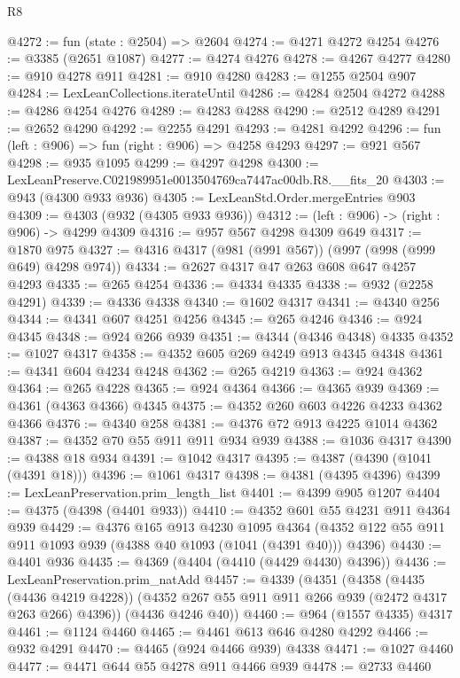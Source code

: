 \begin{lexlean}{R8}
\begin{coremodule}
@4272 := fun (state : @2504) => @2604
@4274 := @4271 @4272 @4254
@4276 := @3385 (@2651 @1087)
@4277 := @4274 @4276
@4278 := @4267 @4277
@4280 := @910 @4278 @911
@4281 := @910 @4280
@4283 := @1255 @2504 @907
@4284 := LexLeanCollections.iterateUntil
@4286 := @4284 @2504 @4272
@4288 := @4286 @4254 @4276
@4289 := @4283 @4288
@4290 := @2512 @4289
@4291 := @2652 @4290
@4292 := @2255 @4291
@4293 := @4281 @4292
@4296 := fun (left : @906) => fun (right : @906) => @4258 @4293
@4297 := @921 @567
@4298 := @935 @1095
@4299 := @4297 @4298
@4300 := LexLeanPreserve.C021989951e0013504769ca7447ac00db.R8.__fits_20
@4303 := @943 (@4300 @933 @936)
@4305 := LexLeanStd.Order.mergeEntries @903
@4309 := @4303 (@932 (@4305 @933 @936))
@4312 := (left : @906) -> (right : @906) -> @4299 @4309
@4316 := @957 @567 @4298 @4309 @649
@4317 := @1870 @975
@4327 := @4316 @4317 (@981 (@991 @567)) (@997 (@998 (@999 @649) @4298 @974))
@4334 := @2627 @4317 @47 @263 @608 @647 @4257 @4293
@4335 := @265 @4254
@4336 := @4334 @4335
@4338 := @932 (@2258 @4291)
@4339 := @4336 @4338
@4340 := @1602 @4317
@4341 := @4340 @256
@4344 := @4341 @607 @4251 @4256
@4345 := @265 @4246
@4346 := @924 @4345
@4348 := @924 @266 @939
@4351 := @4344 (@4346 @4348) @4335
@4352 := @1027 @4317
@4358 := @4352 @605 @269 @4249 @913 @4345 @4348
@4361 := @4341 @604 @4234 @4248
@4362 := @265 @4219
@4363 := @924 @4362
@4364 := @265 @4228
@4365 := @924 @4364
@4366 := @4365 @939
@4369 := @4361 (@4363 @4366) @4345
@4375 := @4352 @260 @603 @4226 @4233 @4362 @4366
@4376 := @4340 @258
@4381 := @4376 @72 @913 @4225 @1014 @4362
@4387 := @4352 @70 @55 @911 @911 @934 @939
@4388 := @1036 @4317
@4390 := @4388 @18 @934
@4391 := @1042 @4317
@4395 := @4387 (@4390 (@1041 (@4391 @18)))
@4396 := @1061 @4317
@4398 := @4381 (@4395 @4396)
@4399 := LexLeanPreservation.prim_length_list
@4401 := @4399 @905 @1207
@4404 := @4375 (@4398 (@4401 @933))
@4410 := @4352 @601 @55 @4231 @911 @4364 @939
@4429 := @4376
    @165
    @913
    @4230
    @1095
    @4364
    (@4352 @122 @55 @911 @911 @1093 @939 (@4388 @40 @1093 (@1041 (@4391 @40))) @4396)
@4430 := @4401 @936
@4435 := @4369 (@4404 (@4410 (@4429 @4430) @4396))
@4436 := LexLeanPreservation.prim_natAdd
@4457 := @4339
    (@4351
      (@4358
        (@4435 (@4436 @4219 @4228))
        (@4352 @267 @55 @911 @911 @266 @939 (@2472 @4317 @263 @266) @4396))
      (@4436 @4246 @40))
@4460 := @964 (@1557 @4335) @4317
@4461 := @1124 @4460
@4465 := @4461 @613 @646 @4280 @4292
@4466 := @932 @4291
@4470 := @4465 (@924 @4466 @939) @4338
@4471 := @1027 @4460
@4477 := @4471 @644 @55 @4278 @911 @4466 @939
@4478 := @2733 @4460

\end{coremodule}
\end{lexlean}
